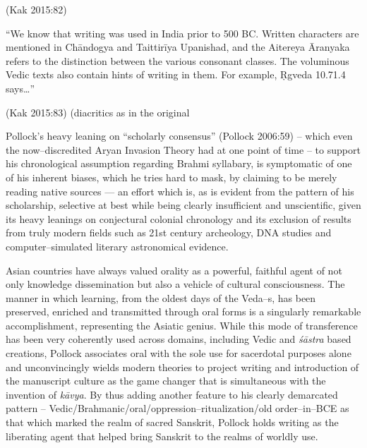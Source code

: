 \hfill (Kak 2015:82)

\begin{myquote}
“We know that writing was used in India prior to 500 BC. Written characters are mentioned in Chāndogya and Taittirīya Upanishad, and the Aitereya Āranyaka refers to the distinction between the various consonant classes. The voluminous Vedic texts also contain hints of writing in them. For example, Ṛgveda 10.71.4 says…”
\end{myquote}

\hfill (Kak 2015:83) (diacritics as in the original

Pollock’s heavy leaning on “scholarly consensus” (Pollock 2006:59) – which even the now–discredited Aryan Invasion Theory had at one point of time – to support his chronological assumption regarding Brahmi syllabary, is symptomatic of one of his inherent biases, which he tries hard to mask, by claiming to be merely reading native sources — an effort which is, as is evident from the pattern of his scholarship, selective at best while being clearly insufficient and unscientific, given its heavy leanings on conjectural colonial chronology and its exclusion of results from truly modern fields such as 21st century archeology, DNA studies and computer–simulated literary astronomical evidence.

Asian countries have always valued orality as a powerful, faithful agent of not only knowledge dissemination but also a vehicle of cultural consciousness. The manner in which learning, from the oldest days of the Veda–s, has been preserved, enriched and transmitted through oral forms is a singularly remarkable accomplishment, representing the Asiatic genius. While this mode of transference has been very coherently used across domains, including Vedic and \textit{śāstra} based creations, Pollock associates oral with the sole use for sacerdotal purposes alone and unconvincingly wields modern theories to project writing and introduction of the manuscript culture as the game changer that is simultaneous with the invention of \textit{kāvya}. By thus adding another feature to his clearly demarcated pattern – Vedic/Brahmanic/oral/oppression–ritualization/old order–in–BCE as that which marked the realm of sacred Sanskrit, Pollock holds writing as the liberating agent that helped bring Sanskrit to the realms of worldly use.

